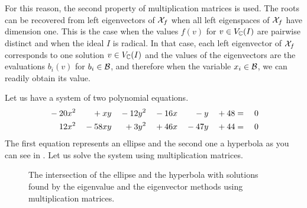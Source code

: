 For this reason, the second property of multiplication matrices is used.
The roots can be recovered from left eigenvectors of $\mathcal{X}_f$ when all left eigenspaces of $\mathcal{X}_f$ have dimension one.
This is the case when the values $f(v)$ for $v\in V_{\mathbb{C}}(I)$ are pairwise distinct and when the ideal $I$ is radical.
In that case, each left eigenvector of $\mathcal{X}_f$ corresponds to one solution $v\in V_{\mathbb{C}}(I)$ and the values of the eigenvectors are the evaluations $b_i(v)$ for $b_i\in\mathcal{B}$, and therefore when the variable $x_i\in\mathcal{B}$, we can readily obtain its value.

\begin{example}
  Let us have a system of two polynomial equations.
  \begin{alignat}{7}
    {}-{}20 & x^2 & {}+{}   & xy & {}-{}12 & y^2 & {}-{}16 & x & {}-{}   & y & {}+{}48 & {}={} & 0 \labeleq{POP:mm:example1}\\
    12      & x^2 & {}-{}58 & xy & {}+{}3  & y^2 & {}+{}46 & x & {}-{}47 & y & {}+{}44 & {}={} & 0 \labeleq{POP:mm:example2}
  \end{alignat}
  The first equation represents an ellipse and the second one a hyperbola as you can see in .
  Let us solve the system using multiplication matrices.

  \begin{figure}[ht]
    \centering
    \resizebox{0.95\textwidth}{!}{}
    \caption{The intersection of the ellipse  and the hyperbola  with solutions found by the eigenvalue and the eigenvector methods using multiplication matrices.}
  \end{figure}


\end{example}
